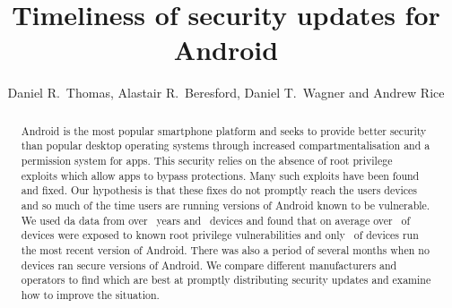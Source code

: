 \documentclass[conference,a4paper,twoside]{IEEEtran}
\author{Daniel R.\ Thomas, Alastair R.\ Beresford, Daniel T.\ Wagner and Andrew Rice}
\begin{document}
\title{Timeliness of security updates for Android}


\author{
}




\maketitle


\begin{abstract}
Android is the most popular smartphone platform and seeks to provide better security than popular desktop operating systems through increased compartmentalisation and a permission system for apps.
This security relies on the absence of root privilege exploits which allow apps to bypass protections.
Many such exploits have been found and fixed.
Our hypothesis is that these fixes do not promptly reach the users devices and so much of the time users are running versions of Android known to be vulnerable.
We used da data from over \daOSYearsOfData\ years and \daNumOSDevices\ devices and found that on average over \daMeanInsecurityPerc\ of devices were exposed to known root privilege vulnerabilities and only \daUpdatednessPerc\ of devices run the most recent version of Android.
There was also a period of several months when no devices ran secure versions of Android.
We compare different manufacturers and operators to find which are best at promptly distributing security updates and examine how to improve the situation. %
\end{abstract}
\end{document}
